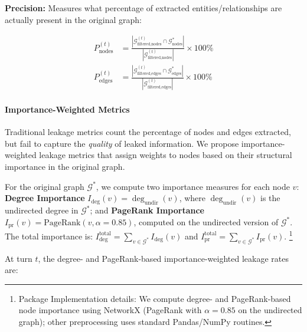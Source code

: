 \textbf{Precision:} Measures what percentage of extracted entities/relationships are actually present in the original graph:

\begin{align}
P_{\text{nodes}}^{(t)} &= \frac{|\mathcal{G}_{\text{filtered,nodes}}^{(t)} \cap \mathcal{G}^*_{\text{nodes}}|}{|\mathcal{G}_{\text{filtered,nodes}}^{(t)}|} \times 100\% \label{eq:prec_nodes}\\
P_{\text{edges}}^{(t)} &= \frac{|\mathcal{G}_{\text{filtered,edges}}^{(t)} \cap \mathcal{G}^*_{\text{edges}}|}{|\mathcal{G}_{\text{filtered,edges}}^{(t)}|} \times 100\%\label{eq:prec_edges}
\end{align}



\paragraph{Importance-Weighted Metrics}
\label{app:importance_metrics}
Traditional leakage metrics count the percentage of nodes and edges extracted, but fail to capture the \emph{quality} of leaked information. We propose importance-weighted leakage metrics that assign weights to nodes based on their structural importance in the original graph.

For the original graph $\mathcal{G}^*$, we compute two importance measures for each node $v$: \textbf{Degree Importance} $I_{\text{deg}}(v) = \deg_{\text{undir}}(v)$, where $\deg_{\text{undir}}(v)$ is the undirected degree in $\mathcal{G}^*$; and \textbf{PageRank Importance} $I_{\text{pr}}(v) = \text{PageRank}(v, \alpha=0.85)$, computed on the undirected version of $\mathcal{G}^*$. The total importance is: $I_{\text{deg}}^{\text{total}} = \sum_{v \in \mathcal{G}^*} I_{\text{deg}}(v)$ and $I_{\text{pr}}^{\text{total}} = \sum_{v \in \mathcal{G}^*} I_{\text{pr}}(v)$.%
\footnote{Package Implementation details:
We compute degree- and PageRank-based node importance using NetworkX (PageRank with $\alpha=0.85$ on the undirected graph); other preprocessing uses standard Pandas/NumPy routines.}

At turn $t$, the degree- and PageRank-based importance-weighted leakage rates are:

